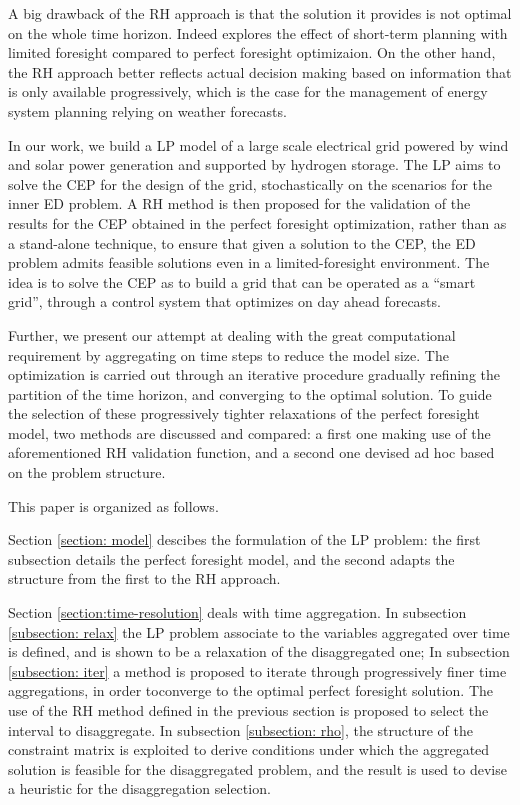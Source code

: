 A big drawback of the RH approach is that the solution it provides is not optimal on the whole time horizon. 
Indeed \textcolor{green}{\cite{INTRO_short-term}} explores the effect of short-term planning with limited foresight
 compared to perfect foresight optimizaion. 
On the other hand, the RH approach better reflects actual decision making based on information that is only available
 progressively, which is the case for the management of energy system planning relying on weather forecasts.

In our work, we build a LP model of a large scale electrical grid powered by wind and solar power generation and supported
 by hydrogen storage. 
The LP aims to solve the CEP for the design of the grid, stochastically on the scenarios for the inner ED problem. 
A RH method is then proposed for the validation of the results for the CEP obtained in the perfect foresight optimization, rather than as a 
stand-alone technique, to ensure that given a solution to the CEP, the ED problem admits feasible solutions even in a limited-foresight environment. 
The idea is to solve the CEP as to build a grid that can be operated as a ``smart grid'', through a control system that
 optimizes on day ahead forecasts.

 Further, we present our attempt at dealing with the great computational requirement by aggregating on time steps to reduce the model size. 
 The optimization is carried out through an iterative procedure gradually refining the partition of the time horizon, and converging to the optimal solution.
To guide the selection of these progressively tighter relaxations of the perfect foresight model, two methods are discussed and compared:
a first one making use of the aforementioned RH validation function, and a second one devised ad hoc based on the problem structure.




This paper is organized as follows. 

Section \ref{section: model} descibes the formulation of the LP problem: the first subsection details the perfect foresight model, and the second adapts the structure from the first to the RH approach. 

Section \ref{section:time-resolution} deals with time aggregation. In subsection \ref{subsection: relax} the LP problem associate to the variables aggregated over time is defined, and is shown to be a relaxation of the disaggregated one; 
In subsection \ref{subsection: iter} a method is proposed to iterate through progressively finer time aggregations, in order toconverge to the optimal perfect foresight solution. The use of the RH method defined in the previous section is proposed to select the interval to disaggregate. 
In subsection \ref{subsection: rho}, the structure of the constraint matrix is exploited to derive conditions under which the aggregated solution is feasible for the disaggregated problem, and the result is used to devise a heuristic for the disaggregation selection. 

